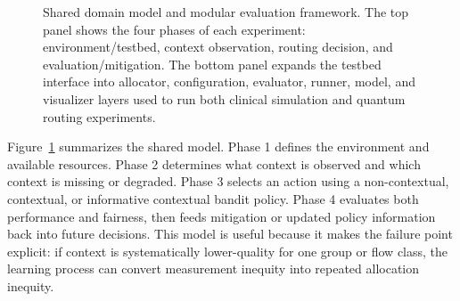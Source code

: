 \documentclass[conference]{IEEEtran}
\begin{document}
\begin{figure}[t]
{}
\caption{Shared domain model and modular evaluation framework. The top panel shows the four phases of each experiment: environment/testbed, context observation, routing decision, and evaluation/mitigation. The bottom panel expands the testbed interface into allocator, configuration, evaluator, runner, model, and visualizer layers used to run both clinical simulation and quantum routing experiments.}
\label{fig:domain_model}
\end{figure}

Figure~\ref{fig:domain_model} summarizes the shared model. Phase 1 defines
the environment and available resources. Phase 2 determines what context is
observed and which context is missing or degraded. Phase 3 selects an action
using a non-contextual, contextual, or informative contextual bandit policy.
Phase 4 evaluates both performance and fairness, then feeds mitigation or
updated policy information back into future decisions. This model is useful
because it makes the failure point explicit: if context is systematically
lower-quality for one group or flow class, the learning process can convert
measurement inequity into repeated allocation inequity.
\end{document}
